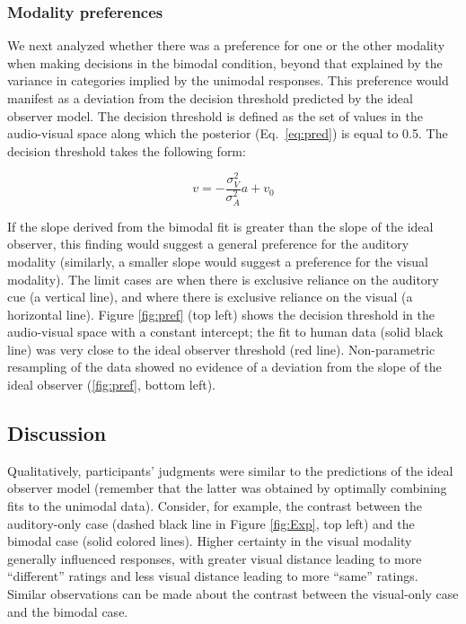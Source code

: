 \documentclass[10pt,letterpaper]{article}
\begin{document}
\subsubsection{Modality preferences}

We next analyzed whether there was a preference for one or the other modality when making decisions in the bimodal condition, beyond that explained by the variance in categories implied by the unimodal responses. This preference would manifest as a deviation from the decision threshold predicted by the ideal observer model. The decision threshold is defined as the set of values in the audio-visual space along which the posterior (Eq.~\ref{eq:pred}) is equal to 0.5. The decision threshold takes the following form:

\begin{equation}
v=-\frac{\sigma^2_V}{\sigma^2_A}a+v_0
\label{eq:threshold}
\end{equation}

If the slope derived from the bimodal fit is greater than the slope of the ideal observer, this finding would suggest a general preference for the auditory modality (similarly, a smaller slope would suggest a preference for the visual modality). The limit cases are when there is exclusive reliance on the auditory cue (a vertical line), and where there is exclusive reliance on the visual (a horizontal line). Figure \ref{fig:pref} (top left) shows the decision threshold in the audio-visual space with a constant intercept; the fit to human data  (solid black line) was very close to the ideal observer threshold (red line). Non-parametric resampling of the data showed no evidence of a deviation from the slope of the ideal observer (\ref{fig:pref}, bottom left).

\subsection{Discussion}

Qualitatively, participants' judgments were similar to the predictions of the ideal observer model (remember that the latter was obtained by optimally combining fits to the unimodal data). Consider, for example, the contrast between the auditory-only case (dashed black line in Figure \ref{fig:Exp}, top left) and the bimodal case (solid colored lines).  Higher certainty in the visual modality generally influenced responses, with greater visual distance leading to more ``different'' ratings and less visual distance leading to more ``same'' ratings. Similar observations can be made about the contrast between the visual-only case and the bimodal case.
\end{document}
